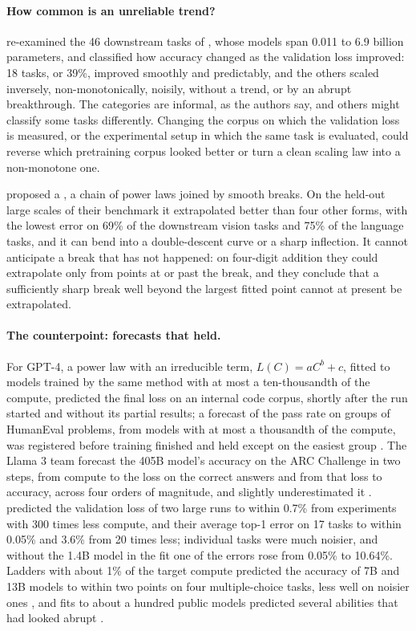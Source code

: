 \begin{refsection}
\paragraph{How common is an unreliable trend?} \Textcite{LourieHuCho2025} re-examined the 46 downstream tasks of \textcite{GadreEtAl2025}, whose models span 0.011 to 6.9 billion parameters, and classified how accuracy changed as the validation loss improved: 18 tasks, or 39\%, improved smoothly and predictably, and the others scaled inversely, non-monotonically, noisily, without a trend, or by an abrupt breakthrough. The categories are informal, as the authors say, and others might classify some tasks differently. Changing the corpus on which the validation loss is measured, or the experimental setup in which the same task is evaluated, could reverse which pretraining corpus looked better or turn a clean scaling law into a non-monotone one.

\Textcite{CaballeroEtAl2023} proposed a , a chain of power laws joined by smooth breaks. On the held-out large scales of their benchmark it extrapolated better than four other forms, with the lowest error on 69\% of the downstream vision tasks and 75\% of the language tasks, and it can bend into a double-descent curve or a sharp inflection. It cannot anticipate a break that has not happened: on four-digit addition they could extrapolate only from points at or past the break, and they conclude that a sufficiently sharp break well beyond the largest fitted point cannot at present be extrapolated.

\paragraph{The counterpoint: forecasts that held.} For GPT-4, a power law with an irreducible term, $L(C)=aC^b+c$, fitted to models trained by the same method with at most a ten-thousandth of the compute, predicted the final loss on an internal code corpus, shortly after the run started and without its partial results; a forecast of the pass rate on groups of HumanEval problems, from models with at most a thousandth of the compute, was registered before training finished and held except on the easiest group \parencite{OpenAI2023}. The Llama 3 team forecast the 405B model's accuracy on the ARC Challenge in two steps, from compute to the loss on the correct answers and from that loss to accuracy, across four orders of magnitude, and slightly underestimated it \parencite{LlamaTeam2024}. \Textcite{GadreEtAl2025} predicted the validation loss of two large runs to within 0.7\% from experiments with 300 times less compute, and their average top-1 error on 17 tasks to within 0.05\% and 3.6\% from 20 times less; individual tasks were much noisier, and without the 1.4B model in the fit one of the errors rose from 0.05\% to 10.64\%. Ladders with about 1\% of the target compute predicted the accuracy of 7B and 13B models to within two points on four multiple-choice tasks, less well on noisier ones \parencite{BhagiaEtAl2025}, and fits to about a hundred public models predicted several abilities that had looked abrupt \parencite{RuanMaddisonHashimoto2024}.


\end{refsection}
